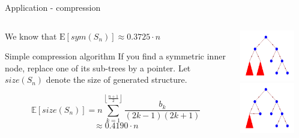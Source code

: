 \documentclass{beamer}
\begin{document}
\begin{frame}{Application - compression}
\begin{columns}
\begin{column}{0.6\textwidth}
We know that $\mathrm{E}[sym(S_n)] \approx 0.3725 \cdot n$ 

\begin{block}{Simple compression algorithm}
If you find a symmetric inner node, replace one of its sub-trees by a pointer.
Let $size(S_n)$ denote the size of generated structure.
\end{block}
$$
  \mathbb{E}[size(S_n)] = n \sum_{k=1}^{\left\lfloor \frac{n+1}{2}\right\rfloor}
\frac{b_k}{(2k-1)(2k+1)}
$$
$$ 
\approx  0.4190 \cdot n
$$
\end{column}
\begin{column}{0.4\textwidth}
\includegraphics[width=0.8\textwidth]{Trees03} \\
\includegraphics[width=0.8\textwidth]{Trees04}
\end{column}
\end{columns}
\end{frame}
\end{document}
